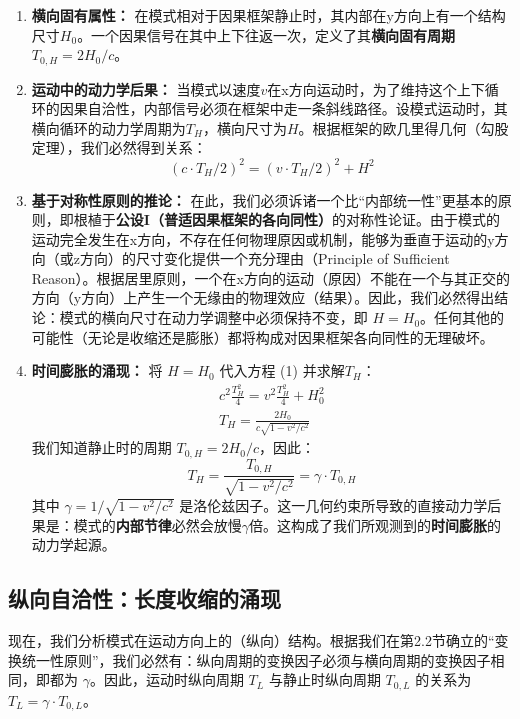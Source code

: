 \documentclass[12pt, a4paper]{article}
\begin{document}
\begin{enumerate}
    \item \textbf{横向固有属性：} 在模式相对于因果框架静止时，其内部在y方向上有一个结构尺寸$H_0$。一个因果信号在其中上下往返一次，定义了其\textbf{横向固有周期 $T_{0,H} = 2H_0 / c$}。
    \item \textbf{运动中的动力学后果：} 当模式以速度$v$在x方向运动时，为了维持这个上下循环的因果自洽性，内部信号必须在框架中走一条斜线路径。设模式运动时，其横向循环的动力学周期为$T_H$，横向尺寸为$H$。根据框架的欧几里得几何（勾股定理），我们必然得到关系：
    \begin{equation}
        (c \cdot T_H / 2)^2 = (v \cdot T_H / 2)^2 + H^2
    \end{equation}
    \item \textbf{基于对称性原则的推论：} 在此，我们必须诉诸一个比``内部统一性''更基本的原则，即根植于\textbf{公设I（普适因果框架的各向同性）}的对称性论证。由于模式的运动完全发生在x方向，不存在任何物理原因或机制，能够为垂直于运动的y方向（或z方向）的尺寸变化提供一个充分理由（Principle of Sufficient Reason）。根据居里原则，一个在x方向的运动（原因）不能在一个与其正交的方向（y方向）上产生一个无缘由的物理效应（结果）。因此，我们必然得出结论：模式的横向尺寸在动力学调整中必须保持不变，即 $H = H_0$。任何其他的可能性（无论是收缩还是膨胀）都将构成对因果框架各向同性的无理破坏。
    \item \textbf{时间膨胀的涌现：} 将 $H = H_0$ 代入方程 (1) 并求解$T_H$：
    \begin{gather}
        c^2 \frac{T_H^2}{4} = v^2 \frac{T_H^2}{4} + H_0^2 \\
        T_H = \frac{2 H_0}{c\sqrt{1 - v^2/c^2}}
    \end{gather}
    我们知道静止时的周期 $T_{0,H} = 2H_0/c$，因此：
    \begin{equation}
        T_H = \frac{T_{0,H}}{\sqrt{1 - v^2/c^2}} = \gamma \cdot T_{0,H}
    \end{equation}
    其中 $\gamma = 1 / \sqrt{1 - v^2/c^2}$ 是洛伦兹因子。这一几何约束所导致的直接动力学后果是：模式的\textbf{内部节律}必然会放慢$\gamma$倍。这构成了我们所观测到的\textbf{时间膨胀}的动力学起源。
\end{enumerate}

\subsection{纵向自洽性：长度收缩的涌现}
现在，我们分析模式在运动方向上的（纵向）结构。根据我们在第2.2节确立的``变换统一性原则''，我们必然有：纵向周期的变换因子必须与横向周期的变换因子相同，即都为 $\gamma$。因此，运动时纵向周期 $T_L$ 与静止时纵向周期 $T_{0,L}$ 的关系为 $T_L = \gamma \cdot T_{0,L}$。
\end{document}
